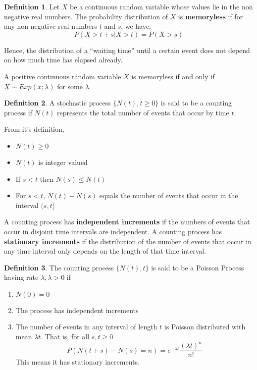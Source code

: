 \documentclass[12pt,letterpaper]{amsbook}
\theoremstyle{definition}
\newtheorem{definition}{Definition}%
\begin{document}
\begin{definition}
Let $X$ be a continuous random variable whose values lie in the non negative real numbers. The probability distribution of $X$ is \textbf{memoryless} if for any non negative real numbers $t$ and $s$, we have:
\[P(X>t + s | X > t) = P(X>s)\]
\end{definition}

Hence, the distribution of a ``waiting time'' until a certain event does not depend on how much time has elapsed already.

\begin{theorem}
  A positive continuous random variable $X$ is memoryless if and only if $X \sim Exp(x;\lambda)$ for some $\lambda$.
\end{theorem}

\begin{definition}
A stochastic process $\{N(t),t \geq 0\}$ is said to be a counting process if $N(t)$ represents the total number of events that occur by time $t$.  
\end{definition}

From it's definition, 
\begin{itemize}
  \item $N(t) \geq 0$
  \item $N(t)$ is integer valued
  \item If $s < t$ then $N(s) \leq N(t)$
  \item For $s < t$, $N(t)-N(s)$ equals the number of events that occur in the interval $(s,t]$
\end{itemize}

A counting process has \textbf{independent increments}  if the numbers of events that occur in disjoint time intervals are independent. A counting process has \textbf{stationary increments} if the distribution of the number of events that occur in any time interval only depends on the length of that time interval.

\begin{definition}
  The counting process $\{N(t),t\}$ is said to be a Poisson Process having rate $\lambda, \lambda > 0$ if 
  \begin{enumerate}
    \item $N(0) = 0$
    \item The process has independent increments
    \item The number of events in any interval of length $t$ is Poisson distributed with mean $\lambda t$. That is, for all $s,t \geq 0$
      \[P(N(t+s) - N(s) = n) = e^{- \lambda t}\frac{(\lambda t) ^ n}{n!}\]
      This means it has stationary increments.
  \end{enumerate}
\end{definition}
\end{document}
